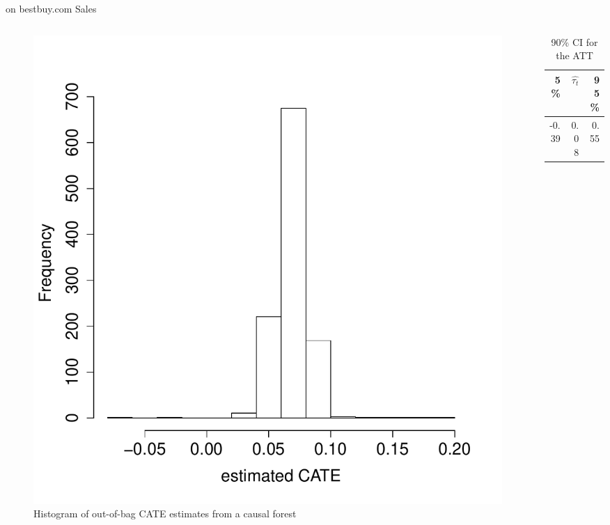 \documentclass[mathserif, xcolor=table]{beamer}
\begin{document}
\begin{frame}{on bestbuy.com Sales}
\vspace{-1em}
\begin{columns}
\begin{column}{.6\textwidth}
 \begin{figure}[h]
    \centering
    \includegraphics[scale=0.3]{figures/tauhat1_bb_hist.pdf}
    \caption{ Histogram of out-of-bag CATE estimates from a causal forest}
    \label{fig:tauhat1_bb_hist}
\end{figure}
 \end{column}

 \begin{column}{.39\textwidth}
 \begin{table}[h]
 \caption{90\% CI for the ATT} 
\centering
\begin{tabular}{rrr}
  \hline
 5\%  & $\hat{\tau_t}$ & 95\% \\ 
  \hline
 -0.39 & 0.08 & 0.55 \\ 
   \hline
\end{tabular}
\end{table}
 \end{column}
\end{columns}
\end{frame}
\end{document}
